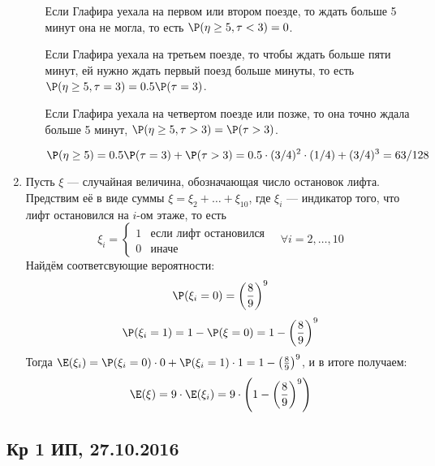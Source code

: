 \begin{enumerate}
\begin{enumerate}
Если Глафира уехала на первом или втором поезде, то ждать больше 5 минут она не могла, то есть $\P(\eta \geq 5, \tau <3)=0$.

Если Глафира уехала на третьем поезде, то чтобы ждать больше пяти минут, ей нужно ждать первый поезд больше минуты, то есть $\P(\eta \geq 5, \tau = 3)=0.5 \P(\tau = 3)$.

Если Глафира уехала на четвертом поезде или позже, то она точно ждала больше 5 минут, $\P(\eta \geq 5, \tau >3)=\P(\tau>3)$.

\[
	\P(\eta \geq 5) = 0.5\P(\tau = 3) + \P(\tau > 3) = 0.5 \cdot (3/4)^2 \cdot (1/4) + (3/4)^3 = 63 / 128
\]

\end{enumerate}
\item Пусть $\xi$ — случайная величина, обозначающая число остановок лифта. Предствим её в виде суммы $\xi = \xi_2 + \ldots + \xi_{10}$, где $\xi_i$ — индикатор
того, что лифт остановился на $i$-ом этаже, то есть
\[
\xi_i = \begin{cases}
1 & \text{если лифт остановился} \\
0 & \text{иначе}
\end{cases}
\quad \forall i = 2, \ldots, 10
\]
Найдём соответсвующие вероятности:
\[
\P(\xi_i = 0) = \left(\frac{8}{9}\right)^9
\]
\[
\P(\xi_i = 1) = 1 - \P(\xi = 0) = 1 - \left(\frac{8}{9}\right)^9
\]
Тогда $\E(\xi_i) = \P(\xi_i = 0) \cdot 0 + \P(\xi_i = 1) \cdot 1 = 1 - \left(\frac{8}{9}\right)^9$, и в итоге получаем:
\[
\E(\xi) = 9 \cdot \E(\xi_i) = 9 \cdot \left(1 - \left(\frac{8}{9}\right)^9\right)
\]
\end{enumerate}




\subsection{Кр 1 ИП, 27.10.2016}



